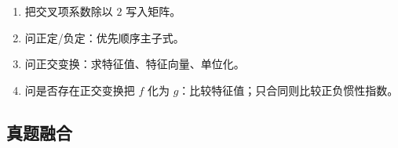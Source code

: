 ﻿\documentclass[11pt,a4paper,UTF8]{ctexart}
\begin{document}
\begin{templatebox}[考场模板]

\begin{enumerate}
\item 把交叉项系数除以 $2$ 写入矩阵。
\item 问正定/负定：优先顺序主子式。
\item 问正交变换：求特征值、特征向量、单位化。
\item 问是否存在正交变换把 $f$ 化为 $g$：比较特征值；只合同则比较正负惯性指数。
\end{enumerate}

\end{templatebox}
\subsection{真题融合}
\end{document}
